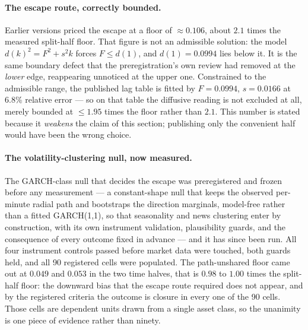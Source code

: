 \documentclass[11pt,a4paper]{article}
\numberwithin{equation}{section}
\begin{document}
\paragraph{The escape route, correctly bounded.} Earlier versions
priced the escape at a floor of $\approx0.106$, about $2.1$ times
the measured split-half floor. That figure is not an admissible
solution: the model $d(k)^2 = F^2 + s^2 k$ forces $F \leq d(1)$,
and $d(1) = 0.0994$ lies below it. It is the same boundary defect
that the preregistration's own review had removed at the
\emph{lower} edge, reappearing unnoticed at the upper one.
Constrained to the admissible range, the published lag table is
fitted by $F = 0.0994$, $s = 0.0166$ at $6.8\%$ relative error ---
so on that table the diffusive reading is not excluded at all,
merely bounded at $\leq1.95$ times the floor rather than $2.1$.
This number is stated because it \emph{weakens} the claim of this
section; publishing only the convenient half would have been the
wrong choice.

\paragraph{The volatility-clustering null, now measured.} The
GARCH-class null that decides the escape was preregistered and
frozen before any measurement --- a constant-shape null that keeps
the observed per-minute radial path and bootstraps the direction
marginals, model-free rather than a fitted GARCH(1,1), so that
seasonality and news clustering enter by construction, with its own
instrument validation, plausibility guards, and the consequence of
every outcome fixed in advance --- and it has since been run. All
four instrument controls passed before market data were touched,
both guards held, and all 90 registered cells were populated. The
path-unshared floor came out at $0.049$ and $0.053$ in the two time
halves, that is $0.98$ to $1.00$ times the split-half floor: the
downward bias that the escape route required does not appear, and
by the registered criteria the outcome is closure in every one of
the 90 cells. Those cells are dependent units drawn from a single
asset class, so the unanimity is one piece of evidence rather than
ninety.
\end{document}
